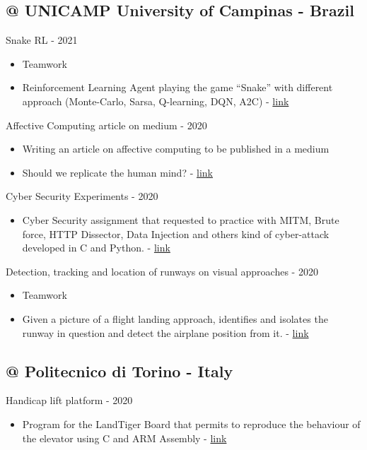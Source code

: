 \documentclass[]{twentysecondcv}
\begin{document}
\subsection{@ UNICAMP University of Campinas - Brazil}
Snake RL - 2021
\begin{itemize}
	\item Teamwork
	\item Reinforcement Learning Agent playing the game “Snake” with different approach (Monte-Carlo, Sarsa, Q-learning, DQN, A2C) - \href{https://github.com/Frequel/SnakeRL}{\textcolor{cerulean}{link}}
\end{itemize}

Affective Computing article on medium - 2020
\begin{itemize}
	\item Writing an article on affective computing to be published in a medium
	\item Should we replicate the human mind? - \href{https://medium.com/emotionai/should-we-replicate-the-human-mind-a6daa018be36}{\textcolor{cerulean}{link}}
\end{itemize}

Cyber Security Experiments - 2020
\begin{itemize}
	\item Cyber Security assignment that requested to practice with MITM, Brute force, HTTP Dissector, Data Injection and others kind of cyber-attack developed in C and Python. - \href{https://github.com/Frequel/Cyber-Security-Unicamp-SEGC2020s2}{\textcolor{cerulean}{link}}
\end{itemize}

Detection, tracking and location of runways on visual approaches - 2020
\begin{itemize}
	\item Teamwork
	\item Given a picture of a flight landing approach, identifies and isolates the runway in question and detect the airplane position from it. - \href{https://github.com/Frequel/projetoea979}{\textcolor{cerulean}{link}}
\end{itemize}
\subsection{@ Politecnico di Torino - Italy}
Handicap lift platform - 2020
\begin{itemize}
	\item Program for the LandTiger Board that permits to reproduce the behaviour of the elevator using C and ARM Assembly -  \href{https://github.com/Frequel/Strairlift-Controller-LPC1768-LANDTIGER-board-Cortex-M3}{\textcolor{cerulean}{link}}
\end{itemize}
\end{document}
